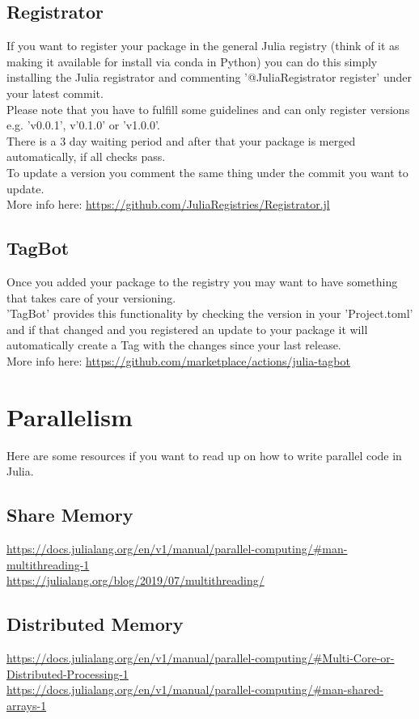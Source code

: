 \documentclass[10pt,a4paper]{article}
\begin{document}
\subsection{Registrator}

If you want to register your package in the general Julia registry (think of it as making it available for install via conda in Python) you can do this simply installing the Julia registrator and commenting '@JuliaRegistrator register' under your latest commit.\\
Please note that you have to fulfill some guidelines and can only register versions e.g. 'v0.0.1', v'0.1.0' or 'v1.0.0'.\\
There is a 3 day waiting period and after that your package is merged automatically, if all checks pass.\\
To update a version you comment the same thing under the commit you want to update.\\
More info here: \url{https://github.com/JuliaRegistries/Registrator.jl}

\subsection{TagBot}

Once you added your package to the registry you may want to have something that takes care of your versioning.\\
'TagBot' provides this functionality by checking the version in your 'Project.toml' and if that changed and you registered an update to your package it will automatically create a Tag with the changes since your last release.\\
More info here: \url{https://github.com/marketplace/actions/julia-tagbot}

\section{Parallelism}

Here are some resources if you want to read up on how to write parallel code in Julia.

\subsection{Share Memory}

\url{https://docs.julialang.org/en/v1/manual/parallel-computing/#man-multithreading-1}\\
\url{https://julialang.org/blog/2019/07/multithreading/}

\subsection{Distributed Memory}

\url{https://docs.julialang.org/en/v1/manual/parallel-computing/#Multi-Core-or-Distributed-Processing-1}\\
\url{https://docs.julialang.org/en/v1/manual/parallel-computing/#man-shared-arrays-1}
\end{document}
